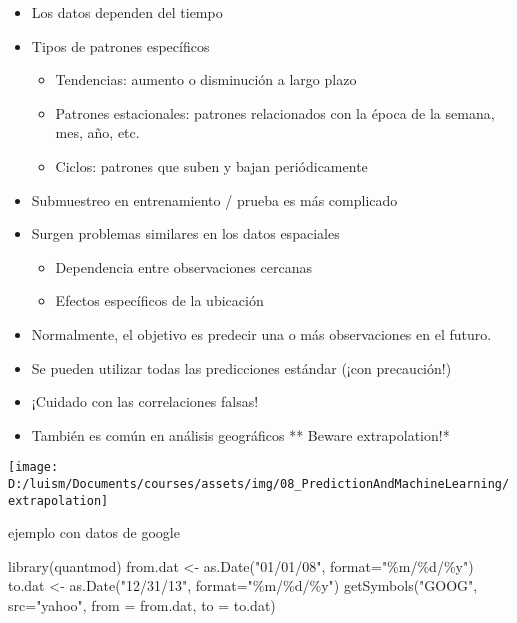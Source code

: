 \documentclass[
]{article}
\newenvironment{Shaded}{\begin{snugshade}}{\end{snugshade}}
\newcommand{\AttributeTok}[1]{\textcolor[rgb]{0.77,0.63,0.00}{#1}}
\newcommand{\FunctionTok}[1]{\textcolor[rgb]{0.00,0.00,0.00}{#1}}
\newcommand{\NormalTok}[1]{#1}
\newcommand{\OtherTok}[1]{\textcolor[rgb]{0.56,0.35,0.01}{#1}}
\newcommand{\StringTok}[1]{\textcolor[rgb]{0.31,0.60,0.02}{#1}}
\providecommand{\tightlist}{%
  \setlength{\itemsep}{0pt}\setlength{\parskip}{0pt}}
\begin{document}
\begin{itemize}
\tightlist
\item
  Los datos dependen del tiempo
\item
  Tipos de patrones específicos

  \begin{itemize}
  \tightlist
  \item
    Tendencias: aumento o disminución a largo plazo
  \item
    Patrones estacionales: patrones relacionados con la época de la
    semana, mes, año, etc.
  \item
    Ciclos: patrones que suben y bajan periódicamente
  \end{itemize}
\item
  Submuestreo en entrenamiento / prueba es más complicado
\item
  Surgen problemas similares en los datos espaciales

  \begin{itemize}
  \tightlist
  \item
    Dependencia entre observaciones cercanas
  \item
    Efectos específicos de la ubicación
  \end{itemize}
\item
  Normalmente, el objetivo es predecir una o más observaciones en el
  futuro.
\item
  Se pueden utilizar todas las predicciones estándar (¡con precaución!)
\item
  ¡Cuidado con las correlaciones falsas!
\item
  También es común en análisis geográficos ** Beware extrapolation!*
\end{itemize}

\begin{center}\texttt{[image: D:/luism/Documents/courses/assets/img/08\_PredictionAndMachineLearning/extrapolation]} \end{center}

ejemplo con datos de google

\begin{Shaded}
\begin{Highlighting}[]
\FunctionTok{library}\NormalTok{(quantmod)}
\NormalTok{from.dat }\OtherTok{\textless{}{-}} \FunctionTok{as.Date}\NormalTok{(}\StringTok{"01/01/08"}\NormalTok{, }\AttributeTok{format=}\StringTok{"\%m/\%d/\%y"}\NormalTok{)}
\NormalTok{to.dat }\OtherTok{\textless{}{-}} \FunctionTok{as.Date}\NormalTok{(}\StringTok{"12/31/13"}\NormalTok{, }\AttributeTok{format=}\StringTok{"\%m/\%d/\%y"}\NormalTok{)}
\FunctionTok{getSymbols}\NormalTok{(}\StringTok{"GOOG"}\NormalTok{, }\AttributeTok{src=}\StringTok{"yahoo"}\NormalTok{, }\AttributeTok{from =}\NormalTok{ from.dat, }\AttributeTok{to =}\NormalTok{ to.dat)}
\end{Highlighting}
\end{Shaded}
\end{document}
